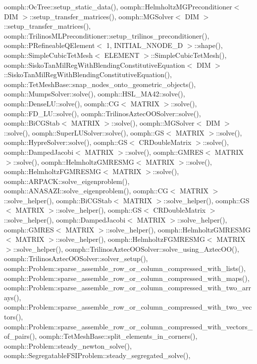 oomph\+::\+Oc\+Tree\+::setup\+\_\+static\+\_\+data(), oomph\+::\+Helmholtz\+M\+G\+Preconditioner$<$ D\+I\+M $>$\+::setup\+\_\+transfer\+\_\+matrices(), oomph\+::\+M\+G\+Solver$<$ D\+I\+M $>$\+::setup\+\_\+transfer\+\_\+matrices(), oomph\+::\+Trilinos\+M\+L\+Preconditioner\+::setup\+\_\+trilinos\+\_\+preconditioner(), oomph\+::\+P\+Refineable\+Q\+Element$<$ 1, I\+N\+I\+T\+I\+A\+L\+\_\+\+N\+N\+O\+D\+E\+\_\+D $>$\+::shape(), oomph\+::\+Simple\+Cubic\+Tet\+Mesh$<$ E\+L\+E\+M\+E\+N\+T $>$\+::\+Simple\+Cubic\+Tet\+Mesh(), oomph\+::\+Sisko\+Tan\+Mil\+Reg\+With\+Blending\+Constitutive\+Equation$<$ D\+I\+M $>$\+::\+Sisko\+Tan\+Mil\+Reg\+With\+Blending\+Constitutive\+Equation(), oomph\+::\+Tet\+Mesh\+Base\+::snap\+\_\+nodes\+\_\+onto\+\_\+geometric\+\_\+objects(), oomph\+::\+Mumps\+Solver\+::solve(), oomph\+::\+H\+S\+L\+\_\+\+M\+A42\+::solve(), oomph\+::\+Dense\+L\+U\+::solve(), oomph\+::\+C\+G$<$ M\+A\+T\+R\+I\+X $>$\+::solve(), oomph\+::\+F\+D\+\_\+\+L\+U\+::solve(), oomph\+::\+Trilinos\+Aztec\+O\+O\+Solver\+::solve(), oomph\+::\+Bi\+C\+G\+Stab$<$ M\+A\+T\+R\+I\+X $>$\+::solve(), oomph\+::\+M\+G\+Solver$<$ D\+I\+M $>$\+::solve(), oomph\+::\+Super\+L\+U\+Solver\+::solve(), oomph\+::\+G\+S$<$ M\+A\+T\+R\+I\+X $>$\+::solve(), oomph\+::\+Hypre\+Solver\+::solve(), oomph\+::\+G\+S$<$ C\+R\+Double\+Matrix $>$\+::solve(), oomph\+::\+Damped\+Jacobi$<$ M\+A\+T\+R\+I\+X $>$\+::solve(), oomph\+::\+G\+M\+R\+E\+S$<$ M\+A\+T\+R\+I\+X $>$\+::solve(), oomph\+::\+Helmholtz\+G\+M\+R\+E\+S\+M\+G$<$ M\+A\+T\+R\+I\+X $>$\+::solve(), oomph\+::\+Helmholtz\+F\+G\+M\+R\+E\+S\+M\+G$<$ M\+A\+T\+R\+I\+X $>$\+::solve(), oomph\+::\+A\+R\+P\+A\+C\+K\+::solve\+\_\+eigenproblem(), oomph\+::\+A\+N\+A\+S\+A\+Z\+I\+::solve\+\_\+eigenproblem(), oomph\+::\+C\+G$<$ M\+A\+T\+R\+I\+X $>$\+::solve\+\_\+helper(), oomph\+::\+Bi\+C\+G\+Stab$<$ M\+A\+T\+R\+I\+X $>$\+::solve\+\_\+helper(), oomph\+::\+G\+S$<$ M\+A\+T\+R\+I\+X $>$\+::solve\+\_\+helper(), oomph\+::\+G\+S$<$ C\+R\+Double\+Matrix $>$\+::solve\+\_\+helper(), oomph\+::\+Damped\+Jacobi$<$ M\+A\+T\+R\+I\+X $>$\+::solve\+\_\+helper(), oomph\+::\+G\+M\+R\+E\+S$<$ M\+A\+T\+R\+I\+X $>$\+::solve\+\_\+helper(), oomph\+::\+Helmholtz\+G\+M\+R\+E\+S\+M\+G$<$ M\+A\+T\+R\+I\+X $>$\+::solve\+\_\+helper(), oomph\+::\+Helmholtz\+F\+G\+M\+R\+E\+S\+M\+G$<$ M\+A\+T\+R\+I\+X $>$\+::solve\+\_\+helper(), oomph\+::\+Trilinos\+Aztec\+O\+O\+Solver\+::solve\+\_\+using\+\_\+\+Aztec\+O\+O(), oomph\+::\+Trilinos\+Aztec\+O\+O\+Solver\+::solver\+\_\+setup(), oomph\+::\+Problem\+::sparse\+\_\+assemble\+\_\+row\+\_\+or\+\_\+column\+\_\+compressed\+\_\+with\+\_\+lists(), oomph\+::\+Problem\+::sparse\+\_\+assemble\+\_\+row\+\_\+or\+\_\+column\+\_\+compressed\+\_\+with\+\_\+maps(), oomph\+::\+Problem\+::sparse\+\_\+assemble\+\_\+row\+\_\+or\+\_\+column\+\_\+compressed\+\_\+with\+\_\+two\+\_\+arrays(), oomph\+::\+Problem\+::sparse\+\_\+assemble\+\_\+row\+\_\+or\+\_\+column\+\_\+compressed\+\_\+with\+\_\+two\+\_\+vectors(), oomph\+::\+Problem\+::sparse\+\_\+assemble\+\_\+row\+\_\+or\+\_\+column\+\_\+compressed\+\_\+with\+\_\+vectors\+\_\+of\+\_\+pairs(), oomph\+::\+Tet\+Mesh\+Base\+::split\+\_\+elements\+\_\+in\+\_\+corners(), oomph\+::\+Problem\+::steady\+\_\+newton\+\_\+solve(), oomph\+::\+Segregatable\+F\+S\+I\+Problem\+::steady\+\_\+segregated\+\_\+solve(), 